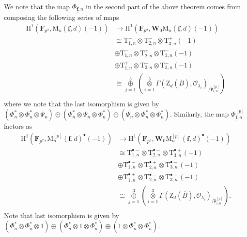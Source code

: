 \documentclass[10pt]{amsart}
\numberwithin{equation}{section}
\theoremstyle{plain}
\numberwithin{equation}{section}
\theoremstyle{definition}
\theoremstyle{remark}
\def\triplef{\underline{\mathbf{f}}}
\def\threetensor{\overset{3}{\underset{i=1}\otimes}}
\def\threesum{\overset{3}{\underset{j=1}\oplus} }
\def\calO{\mathcal{O}}
\def\frakp{\mathfrak{p}}
\def\FF{\mathbf{F}}
\def\rmH{\mathrm{H}}
\def\rmM{\mathrm{M}}
\def\rmT{\mathrm{T}}
\def\rmZ{\mathrm{Z}}
\def\bfW{\mathbf{W}}
\begin{document}
We note that the map $\Phi_{\triplef, n}$ in the second part of the above theorem comes from composing the following series of maps
\begin{equation*}
\begin{aligned}
\rmH^{1}(\FF_{p^{2}}, \rmM_{n}(\triplef, d)(-1))&\rightarrow \rmH^{1}(\FF_{p^{2}}, {\bfW}_{0}\rmM_{n}(\triplef, d)(-1))\\
&\cong \rmT^{-}_{1, n}\otimes\rmT^{-}_{2, n}\otimes \rmT^{+}_{3, n}(-1)\\
&\oplus\rmT^{-}_{1, n}\otimes\rmT^{+}_{2, n}\otimes \rmT^{-}_{3, n}(-1)\\
&\oplus\rmT^{+}_{1, n}\otimes\rmT^{-}_{2, n}\otimes \rmT^{-}_{3, n}(-1)\\
&\cong \threesum(\threetensor\Gamma(\rmZ_{d}(\overline{B}),\calO_{\lambda_{i}})_{/\frakp^{[p]}_{i,n}})\\
\end{aligned}
\end{equation*}
where we note that the last isomorphism is given by $(\Phi^{\ast}_{n}\otimes\Phi^{\ast}_{n}\otimes\Psi_{n})\oplus(\Phi^{\ast}_{n}\otimes\Psi_{n}\otimes \Phi^{\ast}_{n})\oplus(\Psi_{n}\otimes\Phi^{\ast}_{n}\otimes\Phi^{\ast}_{n})$. Similarly, the map $\Phi^{[p]}_{\triplef, n}$ factors as
\begin{equation*}
\begin{aligned}
\rmH^{1}(\FF_{p^{2}}, \rmM^{[p]}_{n}(\triplef, d)^{\bullet}(-1))&\rightarrow \rmH^{1}(\FF_{p^{2}}, {\bfW}_{0}\rmM^{[p]}_{n}(\triplef, d)^{\bullet}(-1))\\
&\cong \rmT^{\bullet-}_{1, n}\otimes\rmT^{\bullet-}_{2, n}\otimes \rmT^{\bullet+}_{3, n}(-1)\\
&\oplus\rmT^{\bullet-}_{1, n}\otimes\rmT^{\bullet+}_{2, n}\otimes \rmT^{\bullet-}_{3, n}(-1)\\
&\oplus\rmT^{\bullet+}_{1, n}\otimes\rmT^{\bullet-}_{2, n}\otimes \rmT^{\bullet-}_{3, n}(-1)\\
&\cong \threesum(\threetensor\Gamma(\rmZ_{d}(\overline{B}),\calO_{\lambda_{i}})_{/\frakp^{[p]}_{i,n}}).\\
\end{aligned}
\end{equation*}
Note that last isomorphism is given by $(\Phi^{\ast}_{n}\otimes\Phi^{\ast}_{n}\otimes 1)\oplus(\Phi^{\ast}_{n}\otimes 1\otimes \Phi^{\ast}_{n})\oplus(1\otimes\Phi^{\ast}_{n}\otimes\Phi^{\ast}_{n})$.
\end{document}
